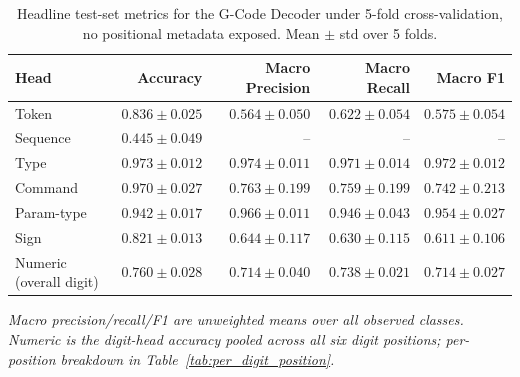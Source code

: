 \begin{table}[h]
\centering
\caption{Headline test-set metrics for the G-Code Decoder under 5-fold cross-validation, no positional metadata exposed. Mean $\pm$ std over 5 folds.}
\label{tab:headline}
\begin{tabular}{l r r r r}
\toprule
Head & Accuracy & Macro Precision & Macro Recall & Macro F1 \\
\midrule
Token       & $0.836 \pm 0.025$ & $0.564 \pm 0.050$ & $0.622 \pm 0.054$ & $0.575 \pm 0.054$ \\
Sequence    & $0.445 \pm 0.049$ & --                & --                & --                \\
Type        & $0.973 \pm 0.012$ & $0.974 \pm 0.011$ & $0.971 \pm 0.014$ & $0.972 \pm 0.012$ \\
Command     & $0.970 \pm 0.027$ & $0.763 \pm 0.199$ & $0.759 \pm 0.199$ & $0.742 \pm 0.213$ \\
Param-type  & $0.942 \pm 0.017$ & $0.966 \pm 0.011$ & $0.946 \pm 0.043$ & $0.954 \pm 0.027$ \\
Sign        & $0.821 \pm 0.013$ & $0.644 \pm 0.117$ & $0.630 \pm 0.115$ & $0.611 \pm 0.106$ \\
Numeric (overall digit) & $0.760 \pm 0.028$ & $0.714 \pm 0.040$ & $0.738 \pm 0.021$ & $0.714 \pm 0.027$ \\
\bottomrule
\end{tabular}
\par\smallskip
\footnotesize\textit{Macro precision/recall/F1 are unweighted means over all observed classes. Numeric is the digit-head accuracy pooled across all six digit positions; per-position breakdown in Table~\ref{tab:per_digit_position}.}
\end{table}
